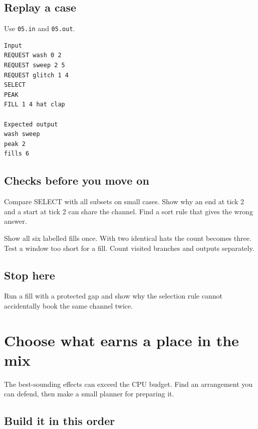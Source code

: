 \documentclass[11pt,letterpaper]{article}
\begin{document}
\subsection*{Replay a case}

Use \texttt{05.in} and \texttt{05.out}.

\begin{samepage}
\small
\begin{verbatim}
Input
REQUEST wash 0 2
REQUEST sweep 2 5
REQUEST glitch 1 4
SELECT
PEAK
FILL 1 4 hat clap

Expected output
wash sweep
peak 2
fills 6
\end{verbatim}
\end{samepage}

\subsection*{Checks before you move on}

Compare SELECT with all subsets on small cases. Show why an end at tick 2 and a start at tick 2 can share the channel. Find a sort rule that gives the wrong answer.

Show all six labelled fills once. With two identical hats the count becomes three. Test a window too short for a fill. Count visited branches and outputs separately.

\subsection*{Stop here}

Run a fill with a protected gap and show why the selection rule cannot accidentally book the same channel twice.

\clearpage

\section{Choose what earns a place in the mix}\label{groovebox:06}

The best-sounding effects can exceed the CPU budget. Find an arrangement you can defend, then make a small planner for preparing it.

\subsection*{Build it in this order}
\end{document}
